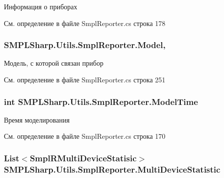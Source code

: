 Информация о приборах 



См. определение в файле Smpl\-Reporter.\-cs строка 178

\hypertarget{class_s_m_p_l_sharp_1_1_utils_1_1_smpl_reporter_af01db9140661991e99d6978c250ff4c1}{
\subsubsection[{Model}]{ S\-M\-P\-L\-Sharp.\-Utils.\-Smpl\-Reporter.\-Model\hspace{0.3cm}{\ttfamily [get]}, {\ttfamily [set]}}}\label{d2/d18/class_s_m_p_l_sharp_1_1_utils_1_1_smpl_reporter_af01db9140661991e99d6978c250ff4c1}


Модель, с которой связан прибор 



См. определение в файле Smpl\-Reporter.\-cs строка 251

\hypertarget{class_s_m_p_l_sharp_1_1_utils_1_1_smpl_reporter_a0115cc791c67a57ba79083c12d4f163b}{
\subsubsection[{Model\-Time}]{\setlength{\rightskip}{0pt plus 5cm}int S\-M\-P\-L\-Sharp.\-Utils.\-Smpl\-Reporter.\-Model\-Time\hspace{0.3cm}{\ttfamily [get]}}}\label{d2/d18/class_s_m_p_l_sharp_1_1_utils_1_1_smpl_reporter_a0115cc791c67a57ba79083c12d4f163b}


Время моделирования 



См. определение в файле Smpl\-Reporter.\-cs строка 170

\hypertarget{class_s_m_p_l_sharp_1_1_utils_1_1_smpl_reporter_abef5661d7d82934362ad8504796b31af}{
\subsubsection[{Multi\-Device\-Statistic}]{\setlength{\rightskip}{0pt plus 5cm}List$<${\bf Smpl\-R\-Multi\-Device\-Statisic}$>$ S\-M\-P\-L\-Sharp.\-Utils.\-Smpl\-Reporter.\-Multi\-Device\-Statistic\hspace{0.3cm}{\ttfamily [get]}}}\label{d2/d18/class_s_m_p_l_sharp_1_1_utils_1_1_smpl_reporter_abef5661d7d82934362ad8504796b31af}


